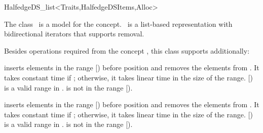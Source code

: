 
\ccRefPageBegin



\begin{ccRefClass}{HalfedgeDS_list<Traits,HalfedgeDSItems,Alloc>}

\ccDefinition
  
The class \ccRefName\ is a model for the  concept.
\ccRefName\ is a list-based representation with bidirectional
iterators that supports removal.


\ccIsModel


\ccTypes
{}

\ccGlue
{}

\ccOperations

Besides operations required from the concept
, this class supports
additionally:


    {inserts elements in the range [) before position 
      and removes the elements from . It takes 
     constant time if \ccVar; otherwise, it takes linear
     time in the size of the range. \ccPrecond [) is a
     valid range in .  is not in the range
     [).}

    {inserts elements in the range [) before position 
      and removes the elements from . It takes 
     constant time if \ccVar; otherwise, it takes linear
     time in the size of the range. \ccPrecond [) is a
     valid range in .  is not in the range
     [).}


\end{ccRefClass}
